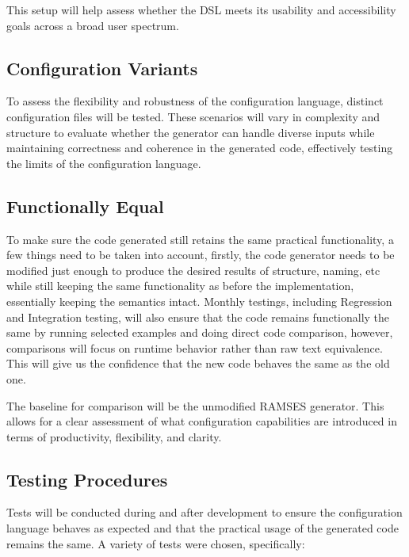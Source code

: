 This setup will help assess whether the DSL meets its usability and accessibility goals across a broad user spectrum.

\subsection*{Configuration Variants}

To assess the flexibility and robustness of the configuration language, distinct configuration files will be tested. These scenarios will vary in complexity and structure to evaluate whether the generator can handle diverse inputs while maintaining correctness and coherence in the generated code, effectively testing the limits of the configuration language.

\subsection*{Functionally Equal}

To make sure the code generated still retains the same practical functionality, a few things need to be taken into account, firstly, the code generator needs to be modified just enough to produce the desired results of structure, naming, etc while still keeping the same functionality as before the implementation, essentially keeping the semantics intact. Monthly testings, including Regression and Integration testing, will also ensure that the code remains functionally the same by running selected examples and doing direct code comparison, however, comparisons will focus on runtime behavior rather than raw text equivalence. This will give us the confidence that the new code behaves the same as the old one.

The baseline for comparison will be the unmodified RAMSES generator. This allows for a clear assessment of what configuration capabilities are introduced in terms of productivity, flexibility, and clarity. 

\subsection*{Testing Procedures}

Tests will be conducted during and after development to ensure the configuration language behaves as expected and that the practical usage of the generated code remains the same. A variety of tests were chosen, specifically:

